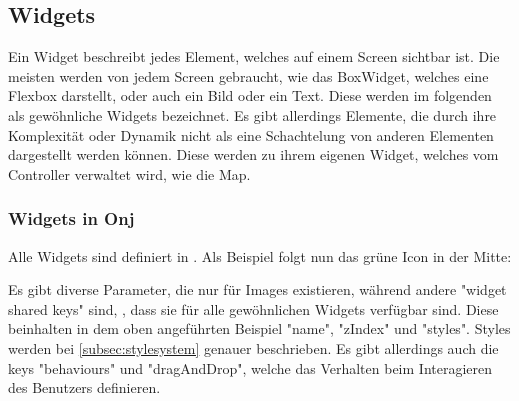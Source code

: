 
\renewcommand{\kapitelautor}{Autor: Felix Zwickelstorfer}
\subsection{Widgets}\label{sec:widgets}
\renewcommand{\kapitelautor}{Autor: Felix Zwickelstorfer}
Ein Widget beschreibt jedes Element, welches auf einem Screen sichtbar ist.
Die meisten werden von jedem Screen gebraucht, wie \zB das Box\-Widget, welches eine Flexbox darstellt, oder auch ein Bild oder ein Text.
Diese werden im folgenden als gewöhnliche Widgets bezeichnet.
Es gibt allerdings Elemente, die durch ihre Komplexität oder Dynamik nicht als eine Schachtelung von anderen Elementen dargestellt werden können.
Diese werden zu ihrem eigenen Widget, welches vom Controller verwaltet wird, wie \zB die Map.
\renewcommand{\kapitelautor}{Autor: Felix Zwickelstorfer}
\subsubsection{Widgets in Onj}\label{subsubsec:widgetsinonj}
\renewcommand{\kapitelautor}{Autor: Felix Zwickelstorfer}
Alle Widgets sind definiert in .
Als Beispiel folgt nun das grüne Icon in der Mitte:
Es gibt diverse Parameter, die nur für Images existieren, während andere "widget shared keys" sind, \dah, dass sie für alle gewöhnlichen Widgets verfügbar sind.
Diese beinhalten in dem oben angeführten Beispiel "name", "zIndex" und "styles".
Styles werden bei \ref{subsec:stylesystem} genauer beschrieben.
Es gibt allerdings auch die keys "behaviours" und "dragAndDrop", welche das Verhalten beim Interagieren des Benutzers definieren.

